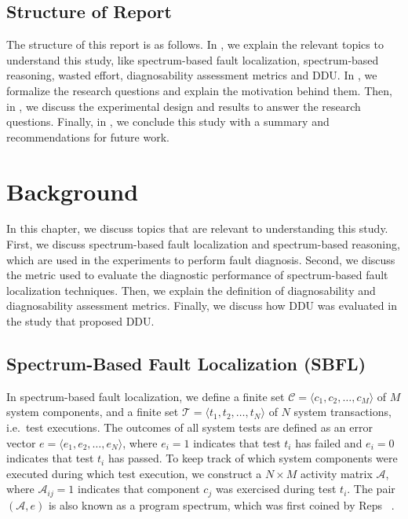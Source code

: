 \documentclass[twoside,a4paper,11pt]{memoir}
\begin{document}
\section{Structure of Report}
The structure of this report is as follows.
In , we explain the relevant topics to understand this study, like spectrum-based fault localization, spectrum-based reasoning, wasted effort, diagnosability assessment metrics and DDU\@.
In , we formalize the research questions and explain the motivation behind them.
Then, in , we discuss the experimental design and results to answer the research questions.
Finally, in , we conclude this study with a summary and recommendations for future work.

\chapter{Background}%
\label{ch:background}

In this chapter, we discuss topics that are relevant to understanding this study.
First, we discuss spectrum-based fault localization and spectrum-based reasoning, which are used in the experiments to perform fault diagnosis.
Second, we discuss the metric used to evaluate the diagnostic performance of spectrum-based fault localization techniques.
Then, we explain the definition of diagnosability and diagnosability assessment metrics.
Finally, we discuss how DDU was evaluated in the study that proposed DDU\@.

\section{Spectrum-Based Fault Localization (SBFL)}
In spectrum-based fault localization, we define a finite set \(\mathcal{C} = \langle c_1, c_2, \ldots, c_M \rangle \) of \(M\) system components, and a finite set \(\mathcal{T} = \langle t_1, t_2, \ldots, t_N \rangle \) of \(N\) system transactions, i.e.\ test executions.
The outcomes of all system tests are defined as an error vector \(e = \langle e_1, e_2, \ldots, e_N \rangle \), where \(e_i = 1 \) indicates that test \(t_i \) has failed and \(e_i = 0 \) indicates that test \(t_i \) has passed.
To keep track of which system components were executed during which test execution, we construct a \(N \times M \) activity matrix \(\mathcal{A} \), where \(\mathcal{A}_{ij} = 1 \) indicates that component \(c_j \) was exercised during test \(t_i \).
The pair \((\mathcal{A}, e) \) is also known as a program spectrum, which was first coined by Reps \etal~\cite{reps1997use}.
\end{document}
